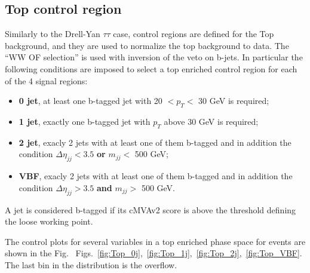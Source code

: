\subsection*{Top control region}
Similarly to the Drell-Yan $\tau\tau$ case, control regions are defined for the Top
background, and they are used to normalize the top background to data.
The ``WW OF selection'' is used with inversion of the veto on b-jets. In
particular the following conditions are imposed to select a top enriched
control region for each of the 4 signal regions:
\begin{itemize}
\item {\bf 0 jet}, at least one b-tagged jet with 20 $< p_T <$ 30 GeV is required;
\item {\bf 1 jet}, exactly one b-tagged jet with $p_T$ above 30 GeV is required;
\item {\bf 2 jet}, exacly 2 jets with at least one of them b-tagged and in addition the condition $\Delta \eta_{jj} < 3.5$ {\bf or} $m_{jj} <$ 500 GeV;
\item {\bf VBF}, exacly 2 jets with at least one of them b-tagged and in addition the condition $\Delta \eta_{jj} > 3.5$ {\bf and} $m_{jj} >$ 500 GeV.
\end{itemize}
A jet is considered b-tagged if its cMVAv2 score is above the threshold
defining the loose working point.

The control plots for several variables in a top enriched phase space for events are shown in the Fig.~ Figs.~\ref{fig:Top_0j},~\ref{fig:Top_1j},~\ref{fig:Top_2j},~\ref{fig:Top_VBF}. The last bin in the distribution is the overflow.



